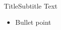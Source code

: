 \documentclass[aspectratio=169,t,11pt,table]{beamer}
\begin{document}

\begin{frame}{Title}{Subtitle}
  Text

  \begin{itemize}
    \item Bullet point
  \end{itemize}
\end{frame}
\end{document}
